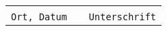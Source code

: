 \documentclass[a4paper,oneside,11pt,bibtotoc,bibliography=openstyle]{scrartcl}
\begin{document}
\newpage
\printbibliography

\newpage
\blindtext\\\\

\begin{tabular}{L{5.5cm} C{0.5cm} L{7.5cm}}
     & & \\
    \texttt{Ort, Datum} & & \texttt{Unterschrift}
\end{tabular}
\end{document}
